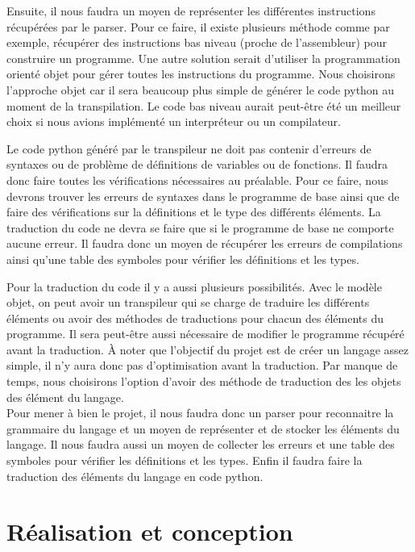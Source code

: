 \documentclass[a4paper]{article}%
\begin{document}
Ensuite, il nous faudra un moyen de représenter les différentes instructions
récupérées par le \gls{parser}. Pour ce faire, il existe plusieurs méthode comme par
exemple, récupérer des instructions bas niveau (proche de l'assembleur) pour
construire un programme. Une autre solution serait d'utiliser la programmation
orienté objet pour gérer toutes les instructions du programme. Nous choisirons
l'approche objet car il sera beaucoup plus simple de générer le code python au
moment de la transpilation. Le code bas niveau aurait peut-être été un meilleur
choix si nous avions implémenté un interpréteur ou un compilateur.

Le code python généré par le transpileur ne doit pas contenir d'erreurs de
syntaxes ou de problème de définitions de variables ou de fonctions. Il faudra
donc faire toutes les vérifications nécessaires au préalable. Pour ce faire,
nous devrons trouver les erreurs de syntaxes dans le programme de base ainsi que
de faire des vérifications sur la définitions et le type des différents
éléments. La traduction du code ne devra se faire que si le programme de base ne
comporte aucune erreur. Il faudra donc un moyen de récupérer les erreurs de
compilations ainsi qu'une table des symboles pour vérifier les définitions et
les types.

Pour la traduction du code il y a aussi plusieurs possibilités. Avec le modèle
objet, on peut avoir un transpileur qui se charge de traduire les différents
éléments ou avoir des méthodes de traductions pour chacun des éléments du
programme. Il sera peut-être aussi nécessaire de modifier le programme récupéré
avant la traduction. À noter que l'objectif du projet est de créer un langage
assez simple, il n'y aura donc pas d'optimisation avant la traduction. Par
manque de temps, nous choisirons l'option d'avoir des méthode de traduction des
les objets des élément du langage.\\

Pour mener à bien le projet, il nous faudra donc un \gls{parser} pour reconnaitre la
grammaire du langage et un moyen de représenter et de stocker les éléments du
langage. Il nous faudra aussi un moyen de collecter les erreurs et une table des
symboles pour vérifier les définitions et les types. Enfin il faudra faire la
traduction des éléments du langage en code python.

\clearpage
\part{Réalisation et conception}
\end{document}
